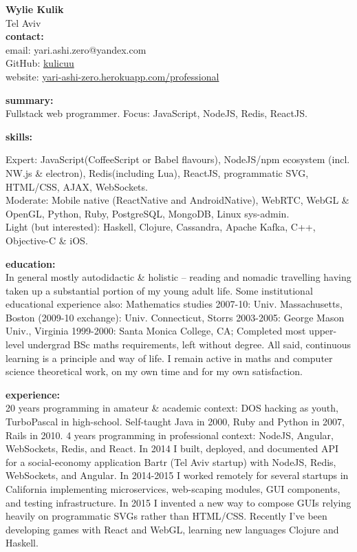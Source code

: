 



\normalFont \engrus
{\bf Wylie Kulik}
\\ Tel Aviv
\sectionSep
\\ {\bf contact:}
\\ email: yari.ashi.zero@yandex.com
\\ GitHub: \href{https://github.com/kulicuu}{kulicuu}
\\ website: \href{https://yari-ashi-zero.herokuapp.com/professional}{yari-ashi-zero.herokuapp.com/professional}

\sectionSep
{\bf summary:}
\\ Fullstack web programmer. Focus: JavaScript, NodeJS, Redis, ReactJS.

\sectionSep
{\bf skills:}

Expert: JavaScript(CoffeeScript or Babel flavours), NodeJS/npm ecosystem (incl. NW.js \& electron), Redis(including Lua), ReactJS, programmatic SVG, HTML/CSS, AJAX, WebSockets.
\\ Moderate: Mobile native (ReactNative and AndroidNative), WebRTC, WebGL \& OpenGL, Python, Ruby, PostgreSQL, MongoDB, Linux sys-admin.
\\ Light (but interested): Haskell, Clojure, Cassandra, Apache Kafka, C++, Objective-C \& iOS.

\sectionSep
{\bf education:}
\\ In general mostly autodidactic \& holistic -- reading and nomadic travelling having taken up a substantial portion of my young adult life. Some institutional educational experience also: Mathematics studies 2007-10: Univ. Massachusetts, Boston (2009-10 exchange): Univ. Connecticut, Storrs 2003-2005: George Mason Univ., Virginia 1999-2000: Santa Monica College, CA; Completed most upper-level undergrad BSc maths requirements, left without degree. All said, continuous learning is a principle and way of life. I remain active in maths and computer science theoretical work, on my own time and for my own satisfaction.

\sectionSep
{\bf experience:}
\\ 20 years programming in amateur \& academic context: DOS hacking as youth, TurboPascal in high-school. Self-taught Java in 2000, Ruby and Python in 2007, Rails in 2010.
4 years programming in professional context: NodeJS, Angular, WebSockets, Redis, and React. In 2014 I built, deployed, and documented API for a social-economy application Bartr (Tel Aviv startup) with NodeJS, Redis, WebSockets, and Angular. In 2014-2015 I worked remotely for several startups in California implementing microservices, web-scaping modules, GUI components, and testing infrastructure. In 2015 I invented a new way to compose GUIs relying heavily on programmatic SVGs rather than HTML/CSS. Recently I've been developing games with React and WebGL, learning new languages Clojure and Haskell.


